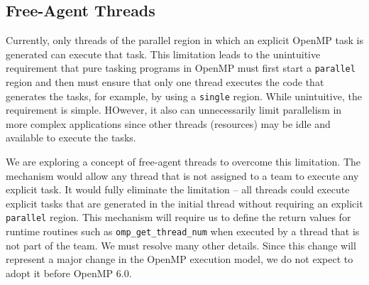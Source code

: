 \subsection{Free-Agent Threads}
\label{sub:task_only_threads}


Currently, only threads of the parallel region in which an explicit
OpenMP task is generated can execute that task. This limitation leads
to the unintuitive requirement that pure tasking programs in OpenMP
must first start a \texttt{parallel} region and then must ensure that 
only one thread executes the code that generates the tasks, for example, 
by using a \texttt{single} region. While unintuitive, the requirement is
simple. HOwever, it also can unnecessarily limit parallelism in more
complex applications since other threads (resources) may be idle and 
available to execute the tasks.

We are exploring a concept of free-agent threads to overcome this 
limitation. The mechanism would allow any thread that is not assigned
to a team to execute any explicit task. It would fully eliminate the
limitation -- all threads could execute explicit tasks that are 
generated in the initial thread without requiring an explicit 
\texttt{parallel} region. This mechanism will require us to define 
the return values for runtime routines such as \texttt{omp\_get\_thread\_num}
when executed by a thread that is not part of the team. We must resolve
many other details. Since this change will represent a major change in 
the OpenMP execution model, we do not expect to adopt it before OpenMP 6.0.




